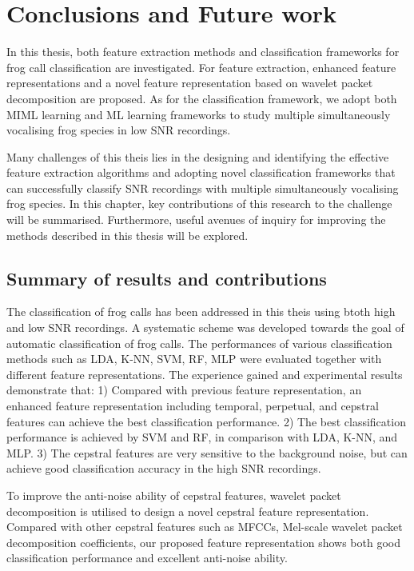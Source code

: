 
\chapter[Conclusions and Future work]{Conclusions and Future work}
\label{cha:cha8Conclusions}



In this thesis, both feature extraction methods and classification frameworks for frog call classification are investigated. For feature extraction, enhanced feature representations and a novel feature representation based on wavelet packet decomposition are proposed. As for the classification framework, we adopt both MIML learning and ML learning  frameworks to study multiple simultaneously vocalising frog species in low SNR recordings. 

Many challenges of this theis lies in the designing and identifying the effective feature extraction algorithms and adopting novel classification frameworks that can successfully classify SNR recordings with multiple simultaneously vocalising frog species. 
In this chapter, key contributions of this research to the challenge will be summarised. Furthermore, useful avenues of inquiry for improving the methods described in this thesis will be explored.

\section{Summary of results and contributions}
	
The classification of frog calls has been addressed in this theis using btoth high and low SNR recordings. A systematic scheme was developed towards the goal of automatic classification of frog calls. The performances of various classification methods such as LDA, K-NN, SVM, RF, MLP were evaluated together with different feature representations. The experience gained and experimental results demonstrate that: 1) Compared with previous feature representation, an enhanced feature representation including temporal, perpetual, and cepstral features can achieve the best classification performance. 2) The best classification performance is achieved by SVM and RF, in comparison with LDA, K-NN, and MLP. 3) The cepstral features are very sensitive to the background noise, but can achieve good classification accuracy in the high SNR recordings. 

To improve the anti-noise ability of cepstral features, wavelet packet decomposition is utilised to design a novel cepstral feature representation. Compared with other cepstral features such as MFCCs, Mel-scale wavelet packet decomposition coefficients, our proposed feature representation shows both good classification performance and excellent anti-noise ability. 

